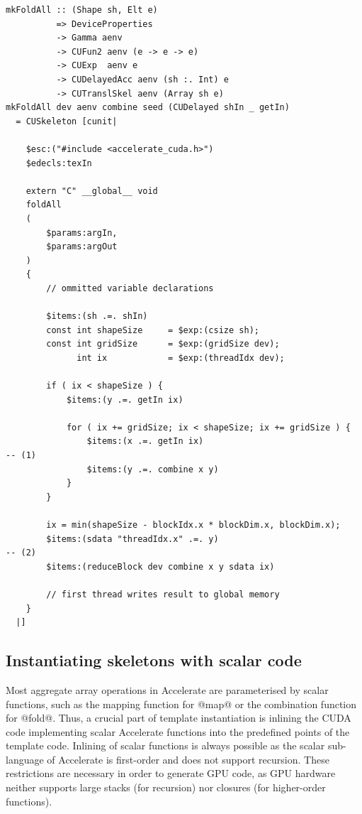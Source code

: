 \begin{lstlisting}[style=haskell_float
    ,label=lst:mkfold
    ,caption={Accelerate CUDA skeleton for the \code{foldAll} operation}]
mkFoldAll :: (Shape sh, Elt e)
          => DeviceProperties
          -> Gamma aenv
          -> CUFun2 aenv (e -> e -> e)
          -> CUExp  aenv e
          -> CUDelayedAcc aenv (sh :. Int) e
          -> CUTranslSkel aenv (Array sh e)
mkFoldAll dev aenv combine seed (CUDelayed shIn _ getIn)
  = CUSkeleton [cunit|

    $esc:("#include <accelerate_cuda.h>")
    $edecls:texIn

    extern "C" __global__ void
    foldAll
    (
        $params:argIn,
        $params:argOut
    )
    {
        // ommitted variable declarations

        $items:(sh .=. shIn)
        const int shapeSize     = $exp:(csize sh);
        const int gridSize      = $exp:(gridSize dev);
              int ix            = $exp:(threadIdx dev);

        if ( ix < shapeSize ) {
            $items:(y .=. getIn ix)

            for ( ix += gridSize; ix < shapeSize; ix += gridSize ) {
                $items:(x .=. getIn ix)                                                -- (1)
                $items:(y .=. combine x y)
            }
        }

        ix = min(shapeSize - blockIdx.x * blockDim.x, blockDim.x);
        $items:(sdata "threadIdx.x" .=. y)                                             -- (2)
        $items:(reduceBlock dev combine x y sdata ix)

        // first thread writes result to global memory
    }
  |]
\end{lstlisting}


\subsection{Instantiating skeletons with scalar code}
\label{sec:instantiating_skeletons_with_scalar_code}

Most aggregate array operations in Accelerate are parameterised by scalar
functions, such as the mapping function for @map@ or the combination
function for @fold@. Thus, a crucial part of template instantiation is
inlining the CUDA code implementing scalar Accelerate functions into the
predefined points of the template code. Inlining of scalar functions is always
possible as the scalar sub-language of Accelerate is first-order and does not
support recursion. These restrictions are necessary in order to generate GPU
code, as GPU hardware neither supports large stacks (for recursion) nor closures
(for higher-order functions).

